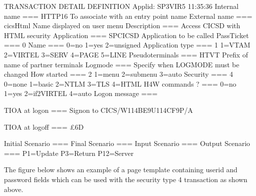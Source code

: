 \documentclass[letterpaper,10pt,english]{sphinxmanual}
\begin{document}
\begin{sphinxVerbatim}[commandchars=\\\{\}]
TRANSACTION DETAIL DEFINITION \PYGZhy{}\PYGZhy{}\PYGZhy{}\PYGZhy{}\PYGZhy{}\PYGZhy{}\PYGZhy{}\PYGZhy{}\PYGZhy{}\PYGZhy{}\PYGZhy{}\PYGZhy{}\PYGZhy{}\PYGZhy{}\PYGZhy{}\PYGZhy{}\PYGZhy{}\PYGZhy{}\PYGZhy{}\PYGZhy{}\PYGZhy{}\PYGZhy{} Applid: SP3VIR5 11:35:36
Internal name ===\PYGZgt{} HTTP\PYGZhy{}16               To associate with an entry point name
External name ===\PYGZgt{} cicsHtml              Name displayed on user menu
Description   ===\PYGZgt{} Access CICSD with HTML security
Application   ===\PYGZgt{} SPCICSD               Application to be called
PassTicket    ===\PYGZgt{} 0 Name ===\PYGZgt{}           0=no 1=yes 2=unsigned
Application type ===\PYGZgt{} 1                  1=VTAM 2=VIRTEL 3=SERV 4=PAGE 5=LINE
Pseudo\PYGZhy{}terminals ===\PYGZgt{} HTVT               Prefix of name of partner terminals
Logmode          ===\PYGZgt{}                    Specify when LOGMODE must be changed
How started      ===\PYGZgt{} 2                  1=menu 2=sub\PYGZhy{}menu 3=auto
Security         ===\PYGZgt{} 4                  0=none 1=basic 2=NTLM 3=TLS 4=HTML
H4W commands ?   ===\PYGZgt{}                    0=no 1=yes 2=if2VIRTEL 4=auto
Logon message    ===\PYGZgt{}

TIOA at logon    ===\PYGZgt{} Signon to CICS\PYGZam{}/W\PYGZam{}\PYGZsq{}114BE9\PYGZsq{}\PYGZam{}U\PYGZam{}\PYGZsq{}114CF9\PYGZsq{}\PYGZam{}P\PYGZam{}/A

TIOA at logoff   ===\PYGZgt{} \PYGZam{}£6D

Initial Scenario ===\PYGZgt{}                     Final Scenario  ===\PYGZgt{}
Input Scenario   ===\PYGZgt{}                     Output Scenario ===\PYGZgt{}
P1=Update                          P3=Return                        P12=Server
\end{sphinxVerbatim}


The figure below shows an example of a page template containing userid and password fields which can be used with
the security type 4 transaction as shown above.
\end{document}
